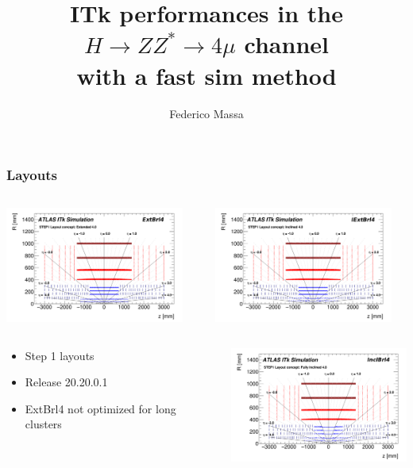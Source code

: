 \documentclass{beamer}
\title{ITk performances in the
$H \rightarrow ZZ^{*} \rightarrow 4\mu$ channel \\
with a fast sim method}
\author{Federico Massa}
\institute{Upgrade Physics}
\date{}
\begin{document}
\begin{frame}
\titlepage
\end{frame}


\begin{frame}
\frametitle{Layouts}
\begin{columns}
\begin{column}{0.5\textwidth}
\includegraphics[width=\textwidth,height=3.8cm]{ExtBrl4}
\end{column}
\begin{column}{0.5\textwidth}
\includegraphics[width=\textwidth,height=3.8cm]{IExtBrl4}
\end{column}
\end{columns}

\begin{columns}
\begin{column}{0.5\textwidth}
\begin{itemize}
\item Step 1 layouts
\item Release 20.20.0.1
\item ExtBrl4 not optimized for long clusters
\end{itemize}
\end{column}
\begin{column}{0.5\textwidth}
\includegraphics[width=\textwidth,height=3.8cm]{InclBrl4}
\end{column}
\end{columns}

\end{frame}
\end{document}
